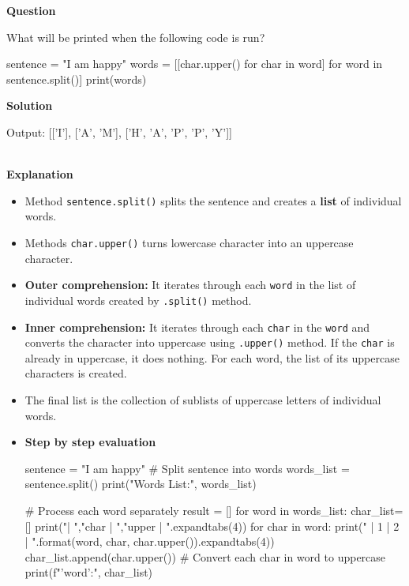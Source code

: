 \documentclass[10pt]{extarticle}
\begin{document}
\textbf{Question}

What will be printed when the following code is run?

    \begin{python}
    sentence = "I am happy"
    words = [[char.upper() for char in word] for word in sentence.split()]
    print(words)

    \end{python}

\noindent\textbf{Solution}

\begin{python}
Output: [['I'], ['A', 'M'], ['H', 'A', 'P', 'P', 'Y']]
\end{python}  \\

\noindent\textbf{Explanation}

\begin{itemize}
    \item Method \colorbox{gray!20}{\texttt{sentence.split()}} splits the sentence and creates a \textbf{list} of individual words.
    \item Methods \colorbox{gray!20}{\texttt{char.upper()}} turns lowercase character into an uppercase character.
    \item \textbf{Outer comprehension:} It iterates through each \texttt{word} in the list of individual words created by \colorbox{gray!20}{\texttt{.split()}} method.
    \item \textbf{Inner comprehension:} It iterates through each \texttt{char} in the \texttt{word} and converts the character into uppercase using \colorbox{gray!20}{\texttt{.upper()}} method. If the \texttt{char} is already in uppercase, it does nothing. For each word, the list of its uppercase characters is created.
    \item The final list is the collection of sublists of uppercase letters of individual words.
    \item \textbf{Step by step evaluation}
    \begin{tcolorbox}[colback=gray!20, colframe=gray!50, sharp corners=southwest]
    \begin{pycode}
sentence = "I am happy"
# Split sentence into words
words_list = sentence.split()
print("Words List:\n", words_list)  

# Process each word separately
result = []
for word in words_list:
  char_list=[]
  print("\nword | ","char | ","upper  | ".expandtabs(4))
  for char in word:
    print(" |   {1}  |   {2}   |  ".format(word, char, char.upper()).expandtabs(4))
    char_list.append(char.upper())  # Convert each char in word to uppercase
  print(f"\nSublist '{word}':", char_list)  
    \end{pycode}
    \end{tcolorbox} 
\end{itemize}
\end{document}
